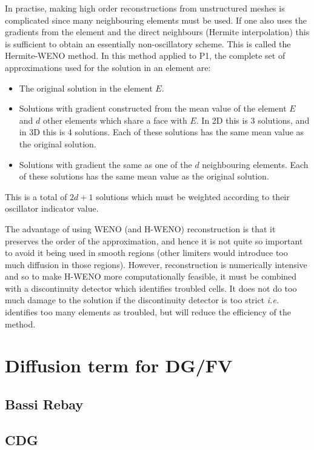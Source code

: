 In practise, making high order reconstructions from unstructured
meshes is complicated since many neighbouring elements must be
used. If one also uses the gradients from the element and the direct
neighbours (Hermite interpolation) this is sufficient to obtain an
essentially non-oscillatory scheme. This is called the Hermite-WENO
method. In this method applied to P1, the complete set of
approximations used for the solution in an element are:
\begin{itemize}
\item The original solution in the element $E$.
\item Solutions with gradient constructed from the mean value of the
  element $E$ and $d$ other elements which share a face with $E$.  In
  2D this is 3 solutions, and in 3D this is 4 solutions. Each of these
  solutions has the same mean value as the original solution.
\item Solutions with gradient the same as one of the $d$ neighbouring
  elements. Each of these solutions has the same mean value as the
  original solution.
\end{itemize}
This is a total of $2d+1$ solutions which must be weighted according
to their oscillator indicator value.

The advantage of using WENO (and H-WENO) reconstruction is that it
preserves the order of the approximation, and hence it is not quite so
important to avoid it being used in smooth regions (other limiters
would introduce too much diffusion in those regions). However,
reconstruction is numerically intensive and so to make H-WENO more
computationally feasible, it must be combined with a discontinuity
detector which identifies troubled cells. It does not do too much
damage to the solution if the discontinuity detector is too strict
\emph{i.e.}  identifies too many elements as troubled, but will reduce
the efficiency of the method. 

\section{Diffusion term for DG/FV}\label{sec:NM_DG_diffusion}
\subsection{Bassi Rebay}
\subsection{CDG}


